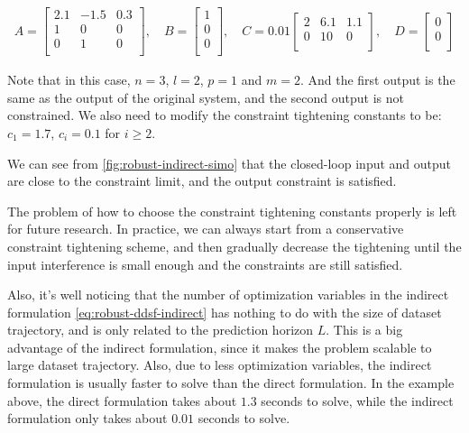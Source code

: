 \begin{align*}
    A = \begin{bmatrix}
        2.1 & -1.5 & 0.3 \\
        1 & 0 & 0 \\
        0 & 1 & 0 \\
    \end{bmatrix}, \quad
    B = \begin{bmatrix}
        1 \\
        0 \\
        0 \\
    \end{bmatrix}, \quad
    C = 0.01 \begin{bmatrix}
        2 & 6.1 & 1.1 \\
        0 & 10 & 0 \\
    \end{bmatrix}, \quad
    D = \begin{bmatrix}
        0 \\
        0 \\
    \end{bmatrix}
\end{align*}

Note that in this case, $n=3$, $l=2$, $p=1$ and $m=2$.
And the first output is the same as the output of the original system, and the second output is not constrained.
We also need to modify the constraint tightening constants to be: $c_1 = 1.7$, $c_i = 0.1$ for $i \geq 2$.

We can see from \cref{fig:robust-indirect-simo} that the closed-loop input and output are close to the constraint limit, and the output constraint is satisfied.


The problem of how to choose the constraint tightening constants properly is left for future research.
In practice, we can always start from a conservative constraint tightening scheme, and then gradually decrease the tightening until the input interference is small enough and the constraints are still satisfied.

Also, it's well noticing that the number of optimization variables in the indirect formulation \cref{eq:robust-ddsf-indirect} has nothing to do with the size of dataset trajectory, and is only related to the prediction horizon $L$.
This is a big advantage of the indirect formulation, since it makes the problem scalable to large dataset trajectory.
Also, due to less optimization variables, the indirect formulation is usually faster to solve than the direct formulation.
In the example above, the direct formulation takes about $1.3$ seconds to solve, while the indirect formulation only takes about $0.01$ seconds to solve.
